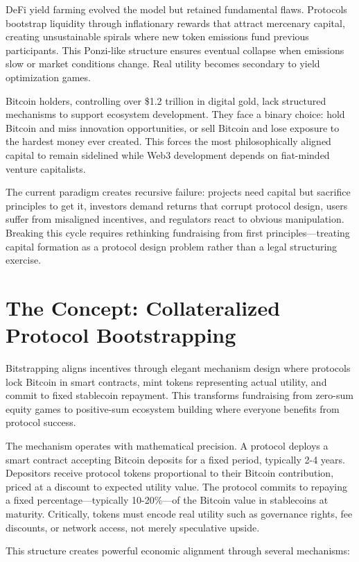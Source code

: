 DeFi yield farming evolved the model but retained fundamental flaws. Protocols bootstrap liquidity through inflationary rewards that attract mercenary capital, creating unsustainable spirals where new token emissions fund previous participants. This Ponzi-like structure ensures eventual collapse when emissions slow or market conditions change. Real utility becomes secondary to yield optimization games.

Bitcoin holders, controlling over \$1.2 trillion in digital gold, lack structured mechanisms to support ecosystem development. They face a binary choice: hold Bitcoin and miss innovation opportunities, or sell Bitcoin and lose exposure to the hardest money ever created. This forces the most philosophically aligned capital to remain sidelined while Web3 development depends on fiat-minded venture capitalists.

The current paradigm creates recursive failure: projects need capital but sacrifice principles to get it, investors demand returns that corrupt protocol design, users suffer from misaligned incentives, and regulators react to obvious manipulation. Breaking this cycle requires rethinking fundraising from first principles—treating capital formation as a protocol design problem rather than a legal structuring exercise.

\section{The Concept: Collateralized Protocol Bootstrapping}

Bitstrapping aligns incentives through elegant mechanism design where protocols lock Bitcoin in smart contracts, mint tokens representing actual utility, and commit to fixed stablecoin repayment. This transforms fundraising from zero-sum equity games to positive-sum ecosystem building where everyone benefits from protocol success.

The mechanism operates with mathematical precision. A protocol deploys a smart contract accepting Bitcoin deposits for a fixed period, typically 2-4 years. Depositors receive protocol tokens proportional to their Bitcoin contribution, priced at a discount to expected utility value. The protocol commits to repaying a fixed percentage—typically 10-20\%—of the Bitcoin value in stablecoins at maturity. Critically, tokens must encode real utility such as governance rights, fee discounts, or network access, not merely speculative upside.

This structure creates powerful economic alignment through several mechanisms:

